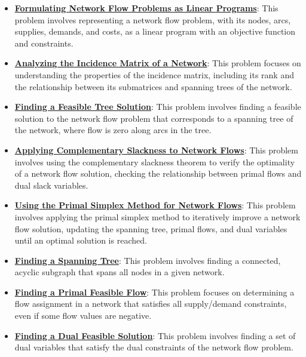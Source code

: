 \documentclass{article}%
\begin{document}
\begin{itemize}[leftmargin=*]
\item \href{https://www.math.purdue.edu/~yipn/421/2024-11-05-NetFlows.pdf#page=2}{\textbf{Formulating Network Flow Problems as Linear Programs}}: This problem involves representing a network flow problem, with its nodes, arcs, supplies, demands, and costs, as a linear program with an objective function and constraints.%
\item \href{https://www.math.purdue.edu/~yipn/421/2024-11-05-NetFlows.pdf#page=6}{\textbf{Analyzing the Incidence Matrix of a Network}}: This problem focuses on understanding the properties of the incidence matrix, including its rank and the relationship between its submatrices and spanning trees of the network.%
\item \href{https://www.math.purdue.edu/~yipn/421/2024-11-05-NetFlows.pdf#page=11}{\textbf{Finding a Feasible Tree Solution}}: This problem involves finding a feasible solution to the network flow problem that corresponds to a spanning tree of the network, where flow is zero along arcs in the tree.%
\item \href{https://www.math.purdue.edu/~yipn/421/2024-11-05-NetFlows.pdf#page=18}{\textbf{Applying Complementary Slackness to Network Flows}}: This problem involves using the complementary slackness theorem to verify the optimality of a network flow solution, checking the relationship between primal flows and dual slack variables.%
\item \href{https://www.math.purdue.edu/~yipn/421/2024-11-05-NetFlows.pdf#page=22}{\textbf{Using the Primal Simplex Method for Network Flows}}: This problem involves applying the primal simplex method to iteratively improve a network flow solution, updating the spanning tree, primal flows, and dual variables until an optimal solution is reached.%
\item \href{https://www.math.purdue.edu/~yipn/421/2024-11-07-NetSimplex.pdf#page=1}{\textbf{Finding a Spanning Tree}}: This problem involves finding a connected, acyclic subgraph that spans all nodes in a given network.%
\item \href{https://www.math.purdue.edu/~yipn/421/2024-11-07-NetSimplex.pdf#page=2}{\textbf{Finding a Primal Feasible Flow}}: This problem focuses on determining a flow assignment in a network that satisfies all supply/demand constraints, even if some flow values are negative.%
\item \href{https://www.math.purdue.edu/~yipn/421/2024-11-07-NetSimplex.pdf#page=3}{\textbf{Finding a Dual Feasible Solution}}: This problem involves finding a set of dual variables that satisfy the dual constraints of the network flow problem.%

\end{itemize}
\end{document}

